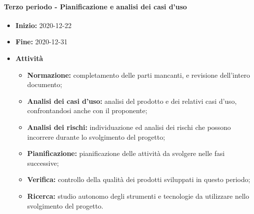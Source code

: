 \paragraph[Terzo periodo]{Terzo periodo - \textnormal{Pianificazione e analisi dei casi d'uso}}
\begin{itemize}
    \item [] \textbf{Inizio:} 2020-12-22
    \item [] \textbf{Fine:} 2020-12-31
    \item [] \textbf{Attività}
          \begin{itemize}
              \item \textbf{Normazione:} completamento delle parti mancanti, e revisione dell'intero documento;
              \item \textbf{Analisi dei casi d'uso:} analisi del prodotto e dei relativi casi d'uso, confrontandosi anche con il proponente;
              \item \textbf{Analisi dei rischi:} individuazione ed analisi dei rischi che possono incorrere durante lo svolgimento del progetto;
              \item \textbf{Pianificazione:} pianificazione delle attività da svolgere nelle fasi successive;
              \item \textbf{Verifica:} controllo della qualità dei prodotti sviluppati in questo periodo;
              \item \textbf{Ricerca:} studio autonomo degli strumenti e tecnologie da utilizzare nello svolgimento del progetto.
          \end{itemize}
\end{itemize}

